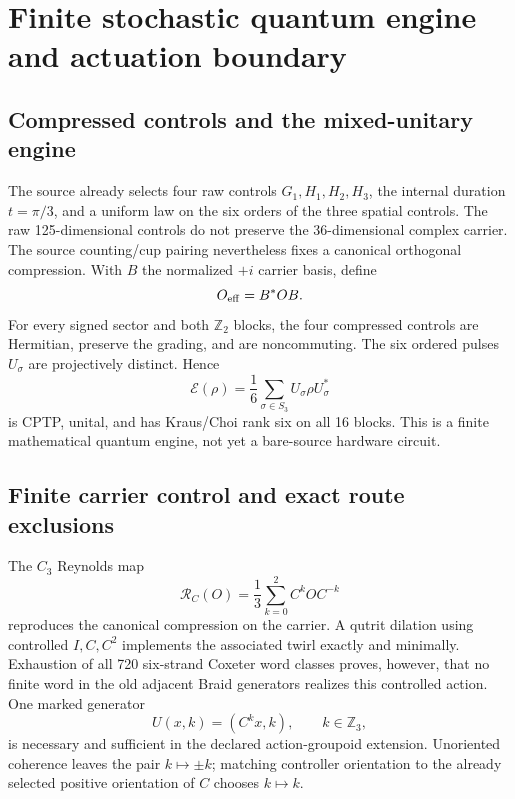 \documentclass[11pt]{article}
\theoremstyle{definition}
\theoremstyle{remark}
\begin{document}
\section{Finite stochastic quantum engine and actuation boundary}\label{sec:engine091}

\subsection{Compressed controls and the mixed-unitary engine}

The source already selects four raw controls $G_1,H_1,H_2,H_3$, the internal duration $t=\pi/3$, and a uniform law on the six orders of the three spatial controls. The raw 125-dimensional controls do not preserve the 36-dimensional complex carrier. The source counting/cup pairing nevertheless fixes a canonical orthogonal compression. With $B$ the normalized $+i$ carrier basis, define
\begin{equation}
 O_{\rm eff}=B^*OB.
\end{equation}
For every signed sector and both $\mathbb Z_2$ blocks, the four compressed controls are Hermitian, preserve the grading, and are noncommuting. The six ordered pulses $U_\sigma$ are projectively distinct. Hence
\begin{equation}
 \mathcal E(\rho)=\frac16\sum_{\sigma\in S_3}U_\sigma\rho U_\sigma^*
 \label{eq:engine091}
\end{equation}
is CPTP, unital, and has Kraus/Choi rank six on all 16 blocks. This is a finite mathematical quantum engine, not yet a bare-source hardware circuit.

\subsection{Finite carrier control and exact route exclusions}

The $C_3$ Reynolds map
\begin{equation}
 \mathcal R_C(O)=\frac13\sum_{k=0}^2 C^kOC^{-k}
\end{equation}
reproduces the canonical compression on the carrier. A qutrit dilation using controlled $I,C,C^2$ implements the associated twirl exactly and minimally. Exhaustion of all 720 six-strand Coxeter word classes proves, however, that no finite word in the old adjacent Braid generators realizes this controlled action. One marked generator
\begin{equation}
 U(x,k)=(C^kx,k),\qquad k\in\mathbb Z_3,
\end{equation}
is necessary and sufficient in the declared action-groupoid extension. Unoriented coherence leaves the pair $k\mapsto\pm k$; matching controller orientation to the already selected positive orientation of $C$ chooses $k\mapsto k$.
\end{document}
